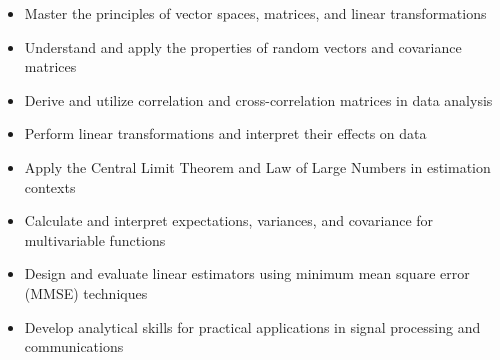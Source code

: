 \documentclass[11pt]{article}
\providecommand{\tightlist}{%
  \setlength{\itemsep}{0pt}\setlength{\parskip}{0pt}}
\begin{document}
\begin{itemize}
\tightlist
\item
  Master the principles of vector spaces, matrices, and linear
  transformations
\item
  Understand and apply the properties of random vectors and covariance
  matrices
\item
  Derive and utilize correlation and cross-correlation matrices in data
  analysis
\item
  Perform linear transformations and interpret their effects on data
\item
  Apply the Central Limit Theorem and Law of Large Numbers in estimation
  contexts
\item
  Calculate and interpret expectations, variances, and covariance for
  multivariable functions
\item
  Design and evaluate linear estimators using minimum mean square error
  (MMSE) techniques
\item
  Develop analytical skills for practical applications in signal
  processing and communications
\end{itemize}
\end{document}
